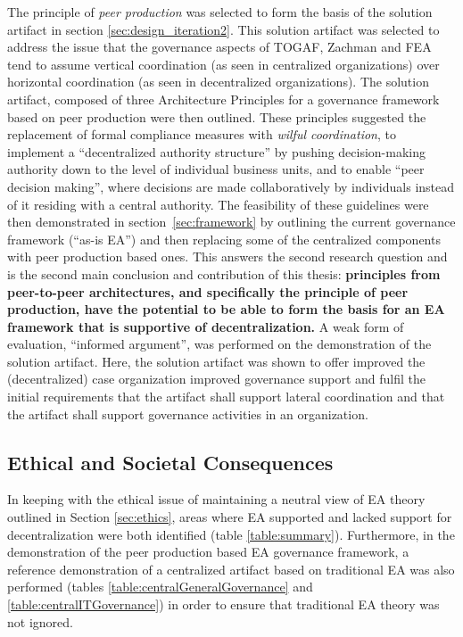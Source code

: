The principle of \textit{peer production} was selected to form the basis of the solution artifact in section \ref{sec:design_iteration2}. This solution artifact was selected to address the issue that the governance aspects of TOGAF, Zachman and FEA tend to assume vertical coordination (as seen in centralized organizations) over horizontal coordination (as seen in decentralized organizations). The solution artifact, composed of three Architecture Principles for a governance framework based on peer production were then outlined. These principles suggested the replacement of formal compliance measures with \textit{wilful coordination}, to implement a ``decentralized authority structure'' by pushing decision-making authority down to the level of individual business units, and to enable ``peer decision making'', where decisions are made collaboratively by individuals instead of it residing with a central authority. The feasibility of these guidelines were then demonstrated in section~\ref{sec:framework} by outlining the current governance framework (``as-is EA'') and then replacing some of the centralized components with peer production based ones. This answers the second research question and is the second main conclusion and contribution of this thesis: \textbf{principles from peer-to-peer architectures, and specifically the principle of peer production, have the potential to be able to form the basis for an EA framework that is supportive of decentralization.} A weak form of evaluation, ``informed argument'', was performed on the demonstration of the solution artifact. Here, the solution artifact was shown to offer improved the (decentralized) case organization improved governance support and fulfil the initial requirements that the artifact shall support lateral coordination and that the artifact shall support governance activities in an organization.

\subsection{Ethical and Societal Consequences}

In keeping with the ethical issue of maintaining a neutral view of EA theory outlined in Section \ref{sec:ethics}, areas where EA supported and lacked support for decentralization were both identified (table \ref{table:summary}). Furthermore, in the demonstration of the peer production based EA governance framework, a reference demonstration of a centralized artifact based on traditional EA was also performed (tables \ref{table:centralGeneralGovernance} and \ref{table:centralITGovernance}) in order to ensure that traditional EA theory was not ignored. 

